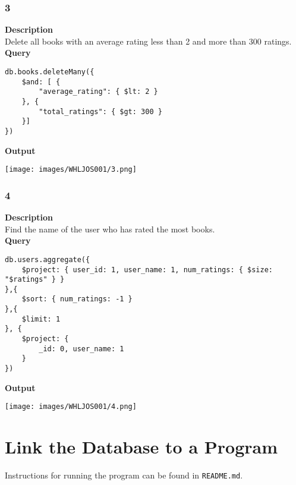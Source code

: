 \documentclass[11pt]{article}
\begin{document}
\subsubsection{3}
\label{sec:org69c637d}
\textbf{Description}\\
Delete all books with an average rating less than 2 and more than 300 ratings.\\
\linebreak
\textbf{Query}
\begin{verbatim}
db.books.deleteMany({
    $and: [ {
        "average_rating": { $lt: 2 }
    }, {
        "total_ratings": { $gt: 300 }
    }]
})
\end{verbatim}
\linebreak
\textbf{Output}\\

\begin{center}
\texttt{[image: images/WHLJOS001/3.png]}
\end{center}
\pagebreak
\subsubsection{4}
\label{sec:org92ffb08}
\textbf{Description}\\
Find the name of the user who has rated the most books.\\
\linebreak
\textbf{Query}
\begin{verbatim}
db.users.aggregate({
    $project: { user_id: 1, user_name: 1, num_ratings: { $size: "$ratings" } }
},{
    $sort: { num_ratings: -1 }
},{
    $limit: 1
}, {
    $project: {
        _id: 0, user_name: 1
    }
})
\end{verbatim}

\linebreak
\textbf{Output}\\
\begin{center}
\texttt{[image: images/WHLJOS001/4.png]}
\end{center}
\section{Link the Database to a Program}
\label{sec:org84f8074}
Instructions for running the program can be found in \texttt{README.md}.
\end{document}
